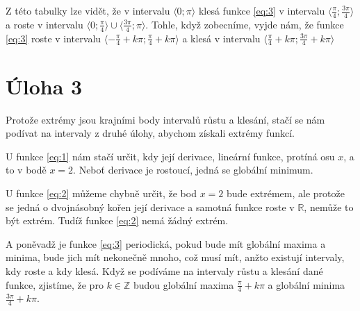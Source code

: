 \documentclass{fkssolpub}
\begin{document}
Z této tabulky lze vidět, že v intervalu $\langle 0; \pi \rangle$ klesá
funkce \ref{eq:3} v intervalu $\langle \frac{\pi}{4}; \frac{3\pi}{4} \rangle$ 
a roste v intervalu $\langle 0; \frac{\pi}{4} \rangle 
\cup \langle \frac{3\pi}{4}; \pi \rangle$. Tohle, když zobecníme, vyjde nám,
že funkce \ref{eq:3} roste v intervalu $\langle -\frac{\pi}{4} + k\pi; \frac{\pi}{4} + k\pi \rangle$
a klesá v intervalu $\langle \frac{\pi}{4} + k\pi; \frac{3\pi}{4} + k\pi \rangle$


\section{Úloha 3}

Protože extrémy jsou krajními body intervalů růstu a klesání, stačí se nám
podívat na intervaly z druhé úlohy, abychom získali extrémy funkcí.

U funkce \ref{eq:1} nám stačí určit, kdy její derivace, lineární funkce, 
protíná osu $x$, a to v bodě $x = 2$. Neboť derivace je rostoucí, jedná
se globální minimum.

U funkce \ref{eq:2} můžeme chybně určit, že bod $x = 2$ bude extrémem,
ale protože se jedná o dvojnásobný kořen její derivace a samotná funkce
roste v $\mathbb{R}$, nemůže to být extrém. Tudíž funkce \ref{eq:2}
nemá žádný extrém.

A poněvadž je funkce \ref{eq:3} periodická, pokud bude mít globální
maxima a minima, bude jich mít nekonečně mnoho, což musí mít, anžto
existují intervaly, kdy roste a kdy klesá. Když se podíváme na 
intervaly růstu a klesání dané funkce, zjistíme, že pro 
$k \in \mathbb{Z}$ budou globální maxima $\frac{\pi}{4} + k\pi$ 
a globální minima $\frac{3\pi}{4} + k\pi$.
\end{document}
